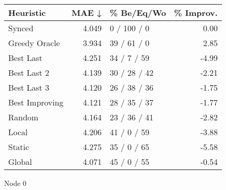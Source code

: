 \begin{tabular}{lrlr}
\toprule
\textbf{Heuristic} & \textbf{MAE ↓} & \textbf{\% Be/Eq/Wo} & \textbf{\% Improv.} \\
\midrule
            Synced &          4.049 &          0 / 100 / 0 &                0.00 \\
     Greedy Oracle &          3.934 &          39 / 61 / 0 &                2.85 \\
         Best Last &          4.251 &          34 / 7 / 59 &               -4.99 \\
       Best Last 2 &          4.139 &         30 / 28 / 42 &               -2.21 \\
       Best Last 3 &          4.120 &         26 / 38 / 36 &               -1.75 \\
    Best Improving &          4.121 &         28 / 35 / 37 &               -1.77 \\
            Random &          4.164 &         23 / 36 / 41 &               -2.82 \\
             Local &          4.206 &          41 / 0 / 59 &               -3.88 \\
            Static &          4.275 &          35 / 0 / 65 &               -5.58 \\
            Global &          4.071 &          45 / 0 / 55 &               -0.54 \\
\bottomrule
\end{tabular}
\caption{Node 0}
\label{tab:hr_non_lr05_le2_bs2_0}
